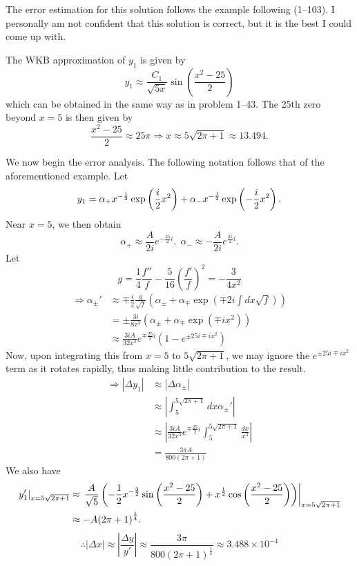 \item
The error estimation for this solution follows the example following  (1--103).
I personally am not confident that this solution is correct, but it is the best I could come up with.

The WKB approximation of $y_1$ is given by
\[
	y_1 \approx \frac{C_1}{\sqrt{5x}} \sin\left( \frac{x^2 - 25}{2} \right)
\]
which can be obtained in the same way as in problem 1--43.
The 25th zero beyond $x = 5$ is then given by
\[
	\frac{x^2 - 25}{2} \approx 25\pi
	\Rightarrow x \approx 5 \sqrt{2\pi + 1} \approx 13.494.
\]

We now begin the error analysis.
The following notation follows that of the aforementioned example.
Let
\[
	y_1 = \alpha_+ x^{-\frac{1}{2}} \exp\left( \frac{i}{2} x^2 \right) + \alpha_- x^{-\frac{1}{2}} \exp\left( -\frac{i}{2} x^2 \right).
\]
Near $x = 5$, we then obtain
\[
	\alpha_+ \approx \frac{A}{2i} e^{-\frac{25}{2}i},\; \alpha_- \approx -\frac{A}{2i} e^{\frac{25}{2}i}.
\]
Let
\[
	g = \frac{1}{4}\frac{f''}{f} - \frac{5}{16}{\left( \frac{f'}{f} \right)}^2
	= -\frac{3}{4x^2}
\]
\begin{align*}
	\Rightarrow \alpha_\pm'
	&\approx \mp \frac{i}{2}\frac{g}{\sqrt{f}} \left( \alpha_\pm + \alpha_\mp \exp\left( \mp 2i \int dx \sqrt{f} \right) \right) \\
	&= \pm \frac{3i}{8x^3} \left( \alpha_\pm + \alpha_\mp \exp\left( \mp ix^2 \right) \right) \\
	&\approx \frac{3iA}{32x^3} e^{\mp \frac{25}{2}i} \left( 1 - e^{\pm 25i \mp ix^2} \right)
\end{align*}
Now, upon integrating this from $x = 5$ to $5 \sqrt{2\pi + 1}$, we may ignore the $e^{\pm 25i \mp ix^2}$ term as it rotates rapidly, thus making little contribution to the result.
\begin{align*}
	\Rightarrow \left| \Delta y_1 \right|
	&\approx \left| \Delta \alpha_\pm \right| \\
	&\approx \left| \int_5^{5 \sqrt{2\pi + 1}} dx \alpha_\pm' \right| \\
	&\approx \left| \frac{3iA}{32x^3} e^{\mp \frac{25}{2}i} \int_5^{5 \sqrt{2\pi + 1}} \frac{dx}{x^3} \right| \\
	&= \frac{3\pi A}{800(2\pi + 1)}
\end{align*}
We also have
\begin{align*}
	\left. y_1' \right|_{x = 5 \sqrt{2\pi + 1}}
	&\approx \left. \frac{A}{\sqrt{5}} \left( -\frac{1}{2} x^{-\frac{3}{2}} \sin\left( \frac{x^2 - 25}{2} \right) + x^{\frac{1}{2}} \cos\left( \frac{x^2 - 25}{2} \right) \right) \right|_{x = 5 \sqrt{2\pi + 1}} \\
	&\approx - A {\left( 2\pi + 1 \right)}^{\frac{1}{4}}.
\end{align*}
\[
	\therefore \left| \Delta x \right|
	\approx \left| \frac{\Delta y}{y'} \right|
	\approx \frac{3\pi}{800 {\left( 2\pi + 1 \right)}^{\frac{1}{4}}}
	\approx 3.488 \times 10^{-4}
\]